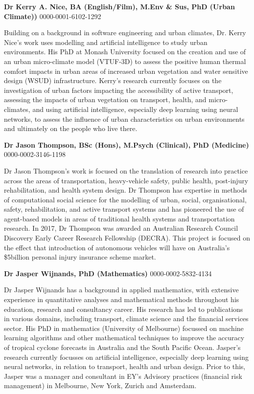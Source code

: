 \documentclass[Crown,sageh,times]{sagej}
\begin{document}
\begin{biogs}
\textbf{Dr Kerry A. Nice, BA (English/Film), M.Env \& Sus, PhD (Urban Climate))}
0000-0001-6102-1292

Building on a background in software engineering and urban climates, Dr. Kerry Nice's work uses modelling and artificial intelligence to study urban environments. His PhD at Monash University focused on the creation and use of an urban micro-climate model (VTUF-3D) to assess the positive human thermal comfort impacts in urban areas of increased urban vegetation and water sensitive design (WSUD) infrastructure. Kerry's research currently focuses on the investigation of urban factors impacting the accessibility of active transport, assessing the impacts of urban vegetation on transport, health, and micro-climates, and using artificial intelligence, especially deep learning using neural networks, to assess the influence of urban characteristics on urban environments and ultimately on the people who live there.

\textbf{Dr Jason Thompson, BSc (Hons), M.Psych (Clinical), PhD (Medicine)}
0000-0002-3146-1198

Dr Jason Thompson’s work is focused on the translation of research into practice across the areas of transportation, heavy-vehicle safety, public health, post-injury rehabilitation, and health system design. Dr Thompson has expertise in methods of computational social science for the modelling of urban, social, organisational, safety, rehabilitation, and active transport systems and has pioneered the use of agent-based models in areas of traditional health systems and transportation research. In 2017, Dr Thompson was awarded an Australian Research Council Discovery Early Career Research Fellowship (DECRA). This project is focused on the effect that introduction of autonomous vehicles will have on Australia’s \$5billion personal injury insurance scheme market.

\textbf{Dr Jasper Wijnands, PhD (Mathematics)}
0000-0002-5832-4134

Dr Jasper Wijnands has a background in applied mathematics, with extensive experience in quantitative analyses and mathematical methods throughout his education, research and consultancy career. His research has led to publications in various domains, including transport, climate science and the financial services sector. His PhD in mathematics (University of Melbourne) focussed on machine learning algorithms and other mathematical techniques to improve the accuracy of tropical cyclone forecasts in Australia and the South Pacific Ocean. Jasper’s research currently focusses on artificial intelligence, especially deep learning using neural networks, in relation to transport, health and urban design. Prior to this, Jasper was a manager and consultant in EY’s Advisory practices (financial risk management) in Melbourne, New York, Zurich and Amsterdam.


\end{biogs}
\end{document}
